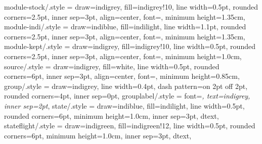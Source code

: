{  %
  module-stock/.style = {draw=indigrey, fill=indigrey!10, line width=0.5pt, rounded corners=2.5pt,
                    inner sep=3pt, align=center, font=\sffamily\footnotesize, minimum height=1.35cm},
  module-indi/.style  = {draw=indiblue, fill=indilight, line width=1.1pt, rounded corners=2.5pt,
                    inner sep=3pt, align=center, font=\sffamily\footnotesize, minimum height=1.35cm},
  module-kept/.style  = {draw=indigrey, fill=indigrey!10, line width=0.5pt, rounded corners=2.5pt,
                    inner sep=3pt, align=center, font=\sffamily\footnotesize, minimum height=1.0cm},
  source/.style  = {draw=indigrey, fill=white, line width=0.5pt, rounded corners=6pt,
                    inner sep=3pt, align=center, font=\sffamily\footnotesize, minimum height=0.85cm},
  group/.style   = {draw=indigrey, line width=0.4pt, dash pattern=on 2pt off 2pt, rounded corners=4pt,
                    inner sep=0pt},
  grouplabel/.style = {font=\sffamily\scriptsize\itshape, text=indigrey, inner sep=2pt},
  state/.style   = {draw=indiblue, fill=indilight, line width=0.5pt, rounded corners=6pt,
                    minimum height=1.0cm, inner sep=3pt, dtext},
  stateflight/.style = {draw=indigreen, fill=indigreen!12, line width=0.5pt, rounded corners=6pt,
                    minimum height=1.0cm, inner sep=3pt, dtext},
}
